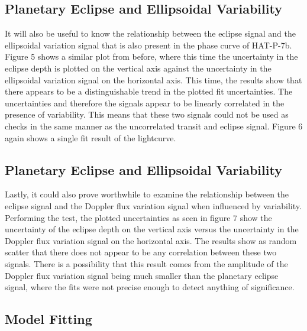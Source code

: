 \documentclass[manuscript]{aastex}
\begin{document}
\subsection{Planetary Eclipse and Ellipsoidal Variability} 

	It will also be useful to know the relationship between the eclipse signal and the ellipsoidal variation signal that is also present in the phase curve of HAT-P-7b. Figure 5 shows a similar plot from before, where this time the uncertainty in the eclipse depth is plotted on the vertical axis against the uncertainty in the ellipsoidal variation signal on the horizontal axis. This time, the results show that there appears to be a distinguishable trend in the plotted fit uncertainties. The uncertainties and therefore the signals appear to be linearly correlated in the presence of variability. This means that these two signals could not be used as checks in the same manner as the uncorrelated transit and eclipse signal. Figure 6 again shows a single fit result of the lightcurve.
   

\subsection{Planetary Eclipse and Ellipsoidal Variability} 

Lastly, it could also prove worthwhile to examine the relationship between the eclipse signal and the Doppler flux variation signal when influenced by variability. Performing the test, the plotted uncertainties as seen in figure 7 show the uncertainty of the eclipse depth on the vertical axis versus the uncertainty in the Doppler flux variation signal on the horizontal axis. The results show as random scatter that there does not appear to be any correlation between these two signals. There is a possibility that this result comes from the amplitude of the Doppler flux variation signal being much smaller than the planetary eclipse signal, where the fits were not precise enough to detect anything of significance. 


\subsection{Model Fitting}

\end{document}
